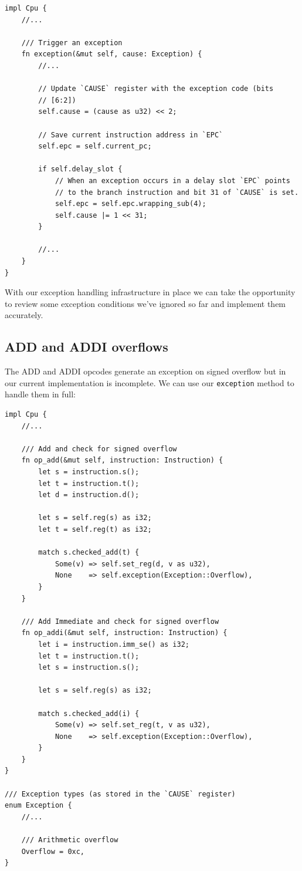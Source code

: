 \documentclass[a4paper]{article}
\newcommand{\code}[1] {\texttt{#1}}
\begin{document}
\begin{lstlisting}
impl Cpu {
    //...

    /// Trigger an exception
    fn exception(&mut self, cause: Exception) {
        //...

        // Update `CAUSE` register with the exception code (bits
        // [6:2])
        self.cause = (cause as u32) << 2;

        // Save current instruction address in `EPC`
        self.epc = self.current_pc;

        if self.delay_slot {
            // When an exception occurs in a delay slot `EPC` points
            // to the branch instruction and bit 31 of `CAUSE` is set.
            self.epc = self.epc.wrapping_sub(4);
            self.cause |= 1 << 31;
        }

        //...
    }
}
\end{lstlisting}

With our exception handling infrastructure in place we can take the
opportunity to review some exception conditions we've ignored so far
and implement them accurately.

\subsection{ADD and ADDI overflows}

The ADD and ADDI opcodes generate an exception on signed overflow but
in our current implementation is incomplete. We can use our
\code{exception} method to handle them in full:

\begin{lstlisting}
impl Cpu {
    //...

    /// Add and check for signed overflow
    fn op_add(&mut self, instruction: Instruction) {
        let s = instruction.s();
        let t = instruction.t();
        let d = instruction.d();

        let s = self.reg(s) as i32;
        let t = self.reg(t) as i32;

        match s.checked_add(t) {
            Some(v) => self.set_reg(d, v as u32),
            None    => self.exception(Exception::Overflow),
        }
    }

    /// Add Immediate and check for signed overflow
    fn op_addi(&mut self, instruction: Instruction) {
        let i = instruction.imm_se() as i32;
        let t = instruction.t();
        let s = instruction.s();

        let s = self.reg(s) as i32;

        match s.checked_add(i) {
            Some(v) => self.set_reg(t, v as u32),
            None    => self.exception(Exception::Overflow),
        }
    }
}

/// Exception types (as stored in the `CAUSE` register)
enum Exception {
    //...

    /// Arithmetic overflow
    Overflow = 0xc,
}
\end{lstlisting}
\end{document}
